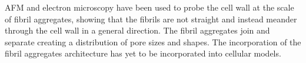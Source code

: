 AFM and electron microscopy have been used to probe the cell wall at the scale of fibril aggregates, showing that the fibrils are not straight and instead meander through the cell wall in a general direction. The fibril aggregates join and separate creating a distribution of pore sizes and shapes. The incorporation of the fibril aggregates architecture has yet to be incorporated into cellular models. 